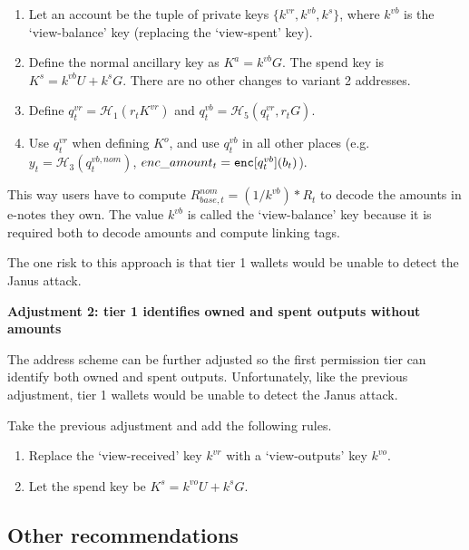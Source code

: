 \begin{enumerate}
    \item Let an account be the tuple of private keys $\{k^{vr}, k^{vb}, k^s\}$, where $k^{vb}$ is the `view-balance' key (replacing the `view-spent' key).

    \item Define the normal ancillary key as $K^a = k^{vb} G$. The spend key is $K^s = k^{vb} U + k^s G$. There are no other changes to variant 2 addresses.

    \item Define $q^{vr}_t = \mathcal{H}_1(r_t K^{vr})$ and $q^{vb}_t = \mathcal{H}_5(q^{vr}_t, r_t G)$.

    \item Use $q^{vr}_t$ when defining $K^o$, and use $q^{vb}_t$ in all other places (e.g.\ $y_t = \mathcal{H}_3(q^{vb,nom}_t)$, $enc\_amount_t = \textrm{\tt enc}[q^{vb}_t](b_t)$).
\end{enumerate}

This way users have to compute $R^{nom}_{base,t} = (1/k^{vb})*R_t$ to decode the amounts in e-notes they own. The value $k^{vb}$ is called the `view-balance' key because it is required both to decode amounts and compute linking tags.

The one risk to this approach is that tier 1 wallets would be unable to detect the Janus attack.

\textbf{Adjustment 2: tier 1 identifies owned and spent outputs without amounts}

The address scheme can be further adjusted so the first permission tier can identify both owned and spent outputs. Unfortunately, like the previous adjustment, tier 1 wallets would be unable to detect the Janus attack.

Take the previous adjustment and add the following rules.

\begin{enumerate}
    \item Replace the `view-received' key $k^{vr}$ with a `view-outputs' key $k^{vo}$.

    \item Let the spend key be $K^s = k^{vo} U + k^s G$.
\end{enumerate}


\subsection{Other recommendations}
\label{subsec:implementers-other-recommendations}

